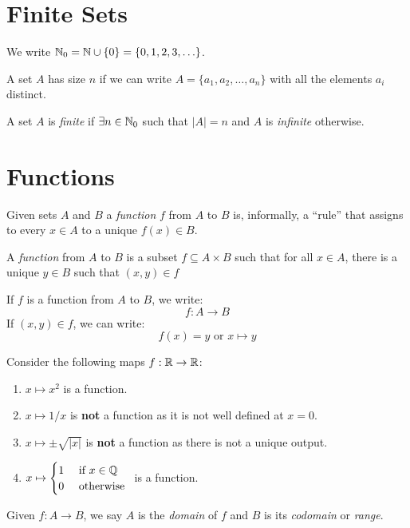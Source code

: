 \documentclass[../main.tex]{subfiles}
\begin{document}
\section{Finite Sets}
\begin{remark}[Notation]
We write $\mathbb{N}_0 = \mathbb{N} \cup \{0\} = \{0, 1, 2, 3, \ldots\}$.
\end{remark}
A set $A$ has size $n$ if we can write $A = \{a_1, a_2, \ldots, a_n\}$ with all the elements $a_i$ distinct.
\begin{definition}
  A set $A$ is \textit{finite} if $\exists n \in \mathbb{N}_0$ such that $|A| = n$ and $A$ is \textit{infinite} otherwise.
\end{definition}
\section{Functions}
  Given sets $A$ and $B$ a \textit{function} $f$ from $A$ to $B$ is, informally, a ``rule'' that assigns to every $x \in A$ to a unique $f(x) \in B$.
\begin{definition}[Function]
  A \textit{function} from $A$ to $B$ is a subset $f \subseteq A \times B$ such that for all $x \in A$, there is a unique $y \in B$ such that $(x, y) \in f$
\end{definition}
\begin{remark}[Notation]
  If $f$ is a function from $A$ to $B$, we write:
  \[
    f: A \to B
  \]
  If $(x, y) \in f$, we can write:
  \[
    f(x) = y \text{ or } x \mapsto y
  \]
\end{remark}
\begin{example}
  Consider the following maps $f: \mathbb{R} \to \mathbb{R}$:
  \begin{enumerate}
    \item $x \mapsto x^2$ is a function.
    \item $x \mapsto 1/x$ is \textbf{not} a function as it is not well defined at $x = 0$.
    \item $x \mapsto \pm\sqrt{|x|}$ is \textbf{not} a function as there is not a unique output.
    \item $
        x \mapsto \begin{cases}
        1 & \text{ if } x \in \mathbb{Q} \\
        0 & \text{ otherwise }
        \end{cases}
        $ is a function.
  \end{enumerate}
\end{example}
\begin{definition}
  Given $f: A \to B$, we say $A$ is the \textit{domain} of $f$ and $B$ is its \textit{codomain} or \textit{range}.
\end{definition}
\end{document}
